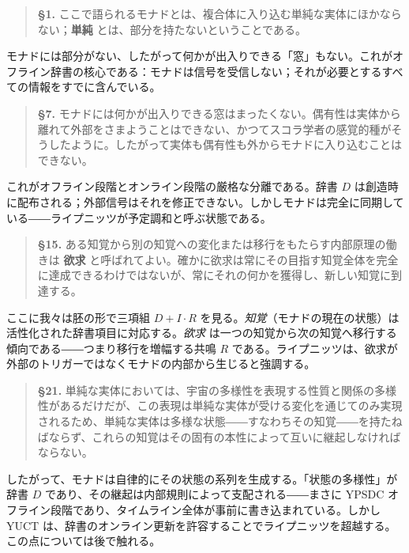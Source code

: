 \documentclass[12pt,a4paper]{article}
\begin{document}
	\begin{quote}
		\textbf{§1.} ここで語られるモナドとは、複合体に入り込む単純な実体にほかならない；\textbf{単純} とは、部分を持たないということである。
	\end{quote}
	
	モナドには部分がない、したがって何かが出入りできる「窓」もない。これがオフライン辞書の核心である：モナドは信号を受信しない；それが必要とするすべての情報をすでに含んでいる。
	
	\begin{quote}
		\textbf{§7.} モナドには何かが出入りできる窓はまったくない。偶有性は実体から離れて外部をさまようことはできない、かつてスコラ学者の感覚的種がそうしたように。したがって実体も偶有性も外からモナドに入り込むことはできない。
	\end{quote}
	
	これがオフライン段階とオンライン段階の厳格な分離である。辞書 \(D\) は創造時に配布される；外部信号はそれを修正できない。しかしモナドは完全に同期している――ライプニッツが予定調和と呼ぶ状態である。
	
	\begin{quote}
		\textbf{§15.} ある知覚から別の知覚への変化または移行をもたらす内部原理の働きは \textbf{欲求} と呼ばれてよい。確かに欲求は常にその目指す知覚全体を完全に達成できるわけではないが、常にそれの何かを獲得し、新しい知覚に到達する。
	\end{quote}
	
	ここに我々は胚の形で三項組 \(D+I\cdot R\) を見る。\emph{知覚}（モナドの現在の状態）は活性化された辞書項目に対応する。\emph{欲求} は一つの知覚から次の知覚へ移行する傾向である――つまり移行を増幅する共鳴 \(R\) である。ライプニッツは、欲求が外部のトリガーではなくモナドの内部から生じると強調する。
	
	\begin{quote}
		\textbf{§21.} 単純な実体においては、宇宙の多様性を表現する性質と関係の多様性があるだけだが、この表現は単純な実体が受ける変化を通じてのみ実現されるため、単純な実体は多様な状態――すなわちその知覚――を持たねばならず、これらの知覚はその固有の本性によって互いに継起しなければならない。
	\end{quote}
	
	したがって、モナドは自律的にその状態の系列を生成する。「状態の多様性」が辞書 \(D\) であり、その継起は内部規則によって支配される――まさに YPSDC オフライン段階であり、タイムライン全体が事前に書き込まれている。しかし YUCT は、辞書のオンライン更新を許容することでライプニッツを超越する。この点については後で触れる。
	
\end{document}

